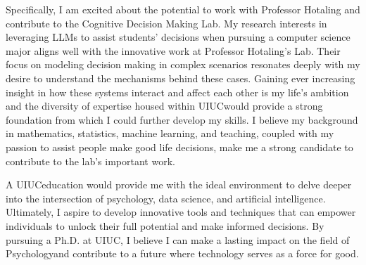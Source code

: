 \documentclass[12pt]{article}
\newcommand{\abbrschool}{UIUC}
\newcommand{\discipline}{Psychology}
\begin{document}
Specifically, I am excited about the potential to work with Professor Hotaling and contribute to the Cognitive Decision Making Lab.  My
research interests in leveraging LLMs to assist students' decisions when pursuing a computer science major aligns well with the innovative
work at Professor Hotaling's Lab. Their focus on modeling decision making in complex scenarios resonates deeply with my desire to understand
the mechanisms behind these cases. Gaining ever increasing insight in how these systems interact and affect each other is my life's ambition
and the diversity of expertise housed within \abbrschool would provide a strong foundation from which I could further develop my skills. I
believe my background in mathematics, statistics, machine learning, and teaching, coupled with my passion to assist people make good life
decisions, make me a strong candidate to contribute to the lab's important work.

A \abbrschool education would provide me with the ideal environment to delve deeper into the intersection of psychology, data science, and
artificial intelligence. Ultimately, I aspire to develop innovative tools and techniques that can empower individuals to unlock their full
potential and make informed decisions. By pursuing a Ph.D. at \abbrschool, I believe I can make a lasting impact on the field of
\discipline and contribute to a future where technology serves as a force for good.
\end{document}
